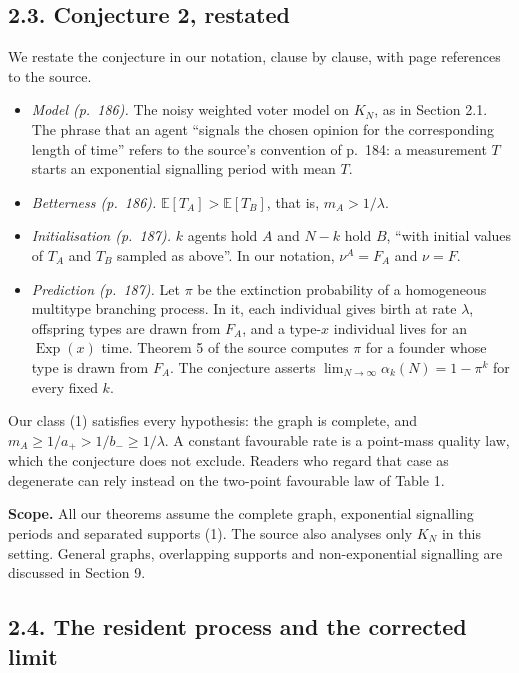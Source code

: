 \documentclass[
  british,
  11pt,
  a4paper,
]{article}
\providecommand{\tightlist}{%
  \setlength{\itemsep}{0pt}\setlength{\parskip}{0pt}}
\begin{document}
\subsection{2.3. Conjecture 2, restated}\label{conjecture-2-restated}

We restate the conjecture in our notation, clause by clause, with page
references to the source.

\begin{itemize}
\tightlist
\item
  \emph{Model (p.~186).} The noisy weighted voter model on \(K_N\), as
  in Section 2.1. The phrase that an agent ``signals the chosen opinion
  for the corresponding length of time'' refers to the source's
  convention of p.~184: a measurement \(T\) starts an exponential
  signalling period with mean \(T\).
\item
  \emph{Betterness (p.~186).} \(\mathbb E[T_A]>\mathbb E[T_B]\), that
  is, \(m_A>1/\lambda\).
\item
  \emph{Initialisation (p.~187).} \(k\) agents hold \(A\) and \(N-k\)
  hold \(B\), ``with initial values of \(T_A\) and \(T_B\) sampled as
  above''. In our notation, \(\nu^A=F_A\) and \(\nu=F\).
\item
  \emph{Prediction (p.~187).} Let \(\pi\) be the extinction probability
  of a homogeneous multitype branching process. In it, each individual
  gives birth at rate \(\lambda\), offspring types are drawn from
  \(F_A\), and a type-\(x\) individual lives for an
  \(\operatorname{Exp}(x)\) time. Theorem 5 of the source computes
  \(\pi\) for a founder whose type is drawn from \(F_A\). The conjecture
  asserts \(\lim_{N\to\infty}\alpha_k(N)=1-\pi^k\) for every fixed
  \(k\).
\end{itemize}

Our class (1) satisfies every hypothesis: the graph is complete, and
\(m_A\ge1/a_+>1/b_-\ge1/\lambda\). A constant favourable rate is a
point-mass quality law, which the conjecture does not exclude. Readers
who regard that case as degenerate can rely instead on the two-point
favourable law of Table 1.

\textbf{Scope.} All our theorems assume the complete graph, exponential
signalling periods and separated supports (1). The source also analyses
only \(K_N\) in this setting. General graphs, overlapping supports and
non-exponential signalling are discussed in Section 9.

\subsection{2.4. The resident process and the corrected
limit}\label{the-resident-process-and-the-corrected-limit}
\end{document}
